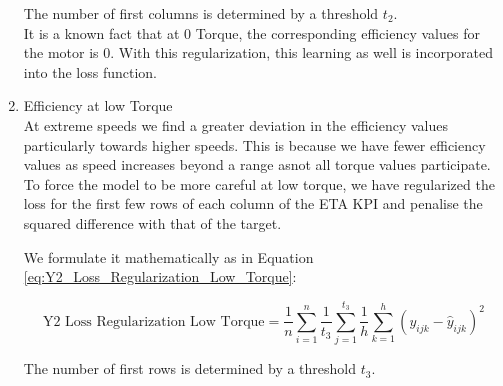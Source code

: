\documentclass{report} %
\begin{document}
\begin{enumerate}

\vspace{0.2cm} %

The number of first columns is determined by a threshold $t_{2}$. \\
It is a known fact that at 0 Torque, the corresponding efficiency values for the motor is 0. With this regularization, this learning as well is incorporated into the loss function.\\

\item Efficiency at low Torque \\

At extreme speeds we find a greater deviation in the efficiency values particularly towards higher speeds. This is because we have fewer efficiency values as speed increases beyond a range asnot all torque values participate.
To force the model to be more careful at low torque, we have regularized the loss for the first few rows of each column of the ETA \ac{KPI} and penalise the squared difference with that of the target.

We formulate it mathematically as in Equation \ref{eq:Y2_Loss_Regularization_Low_Torque}:

\begin{equation}
    \text{Y2 Loss Regularization Low Torque} = \frac{1}{n} \sum_{i=1}^{n} \frac{1}{t_{3}} \sum_{j=1}^{t_{3}} \frac{1}{h} \sum_{k=1}^{h} (y_{ijk} - \hat{y}_{ijk})^2
    \label{eq:Y2_Loss_Regularization_Low_Torque}
\end{equation}


\vspace{0.2cm} %

The number of first rows is determined by a threshold $t_{3}$.

\end{enumerate}
\end{document}
